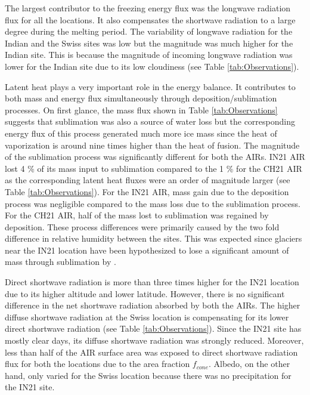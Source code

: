 \documentclass[utf8]{frontiersSCNS} %
\begin{document}
The largest contributor to the freezing energy flux was the longwave radiation flux for all the locations.
It also compensates the shortwave radiation to a large degree during the melting period. The variability of
longwave radiation for the Indian and the Swiss sites was low but the magnitude was much higher for the Indian
site. This is because the  magnitude of incoming longwave radiation was lower for the Indian site due to its low
cloudiness (see Table \ref{tab:Observations}).

Latent heat plays a very important role in the energy balance. It contributes to both mass and energy flux
simultaneously through deposition/sublimation processes. On first glance, the mass flux shown in Table
\ref{tab:Observations} suggests that sublimation was also a source of water loss but the corresponding energy flux
of this process generated much more ice mass since the heat of vaporization is around nine times higher than the
heat of fusion. The magnitude of the sublimation process was significantly different for both the AIRs. IN21 AIR
lost 4 \% of its mass input to sublimation compared to the 1 \% for the CH21 AIR as the corresponding latent heat
fluxes were an order of magnitude larger (see Table \ref{tab:Observations}). For the IN21 AIR, mass gain due to the
deposition process was negligible compared to the mass loss due to the sublimation process. For the CH21 AIR, half
of the mass lost to sublimation was regained by deposition.  These process differences were primarily caused by the
two fold difference in relative humidity between the sites. This was expected since glaciers near the IN21 location
have been hypothesized to lose a significant amount of mass through sublimation by \cite{azam_2018}.


Direct shortwave radiation is more than three times higher for the IN21 location due to its higher altitude and lower latitude. However,
there is no significant difference in the net shortwave radiation absorbed by both the AIRs. The
higher diffuse shortwave radiation at the Swiss location is compensating for its lower direct shortwave radiation (see
Table \ref{tab:Observations}).  Since the IN21 site has mostly clear days, its diffuse shortwave radiation
was strongly reduced. Moreover, less than half of the AIR surface area was exposed to direct shortwave radiation flux for
both the locations due to the area fraction $f_{cone}$.   Albedo, on the other hand, only varied for the Swiss
location because there was no precipitation for the IN21 site.
\end{document}
